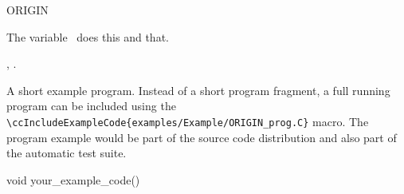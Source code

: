 

\begin{ccRefVariable}{ORIGIN}  %


\ccDefinition
  
The variable \ccRefName\ does this and that.



\ccIsModel


\ccSeeAlso

,
.

\ccExample

A short example program.
Instead of a short program fragment, a full running program can be
included using the 
\verb|\ccIncludeExampleCode{examples/Example/ORIGIN_prog.C}| 
macro. The program example would be part of the source code distribution and
also part of the automatic test suite.

\begin{ccExampleCode}
void your_example_code() {
}
\end{ccExampleCode}


\end{ccRefVariable}


